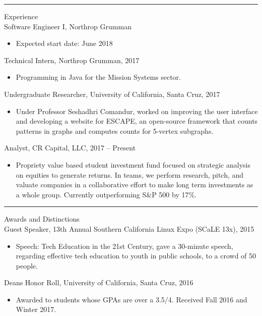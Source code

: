 \documentclass{res}
\begin{document}
\begin{resume}
\hrule width18.5cm

{\huge Experience}\\[2mm]
{\Large Software Engineer I, Northrop Grumman}\\
	\begin{itemize}
		\vspace{-3mm}
		\item Expected start date: June 2018
	\end{itemize}
{\Large Technical Intern, Northrop Grumman, 2017}\\
	\begin{itemize}
		\vspace{-3mm}
		\item Programming in Java for the Mission Systems sector.
	\end{itemize}
{\Large Undergraduate Researcher, University of California, Santa Cruz, 2017}\\
	\begin{itemize}
		\vspace{-3mm}
		\item Under Professor Seshadhri Comandur, worked on improving the user interface and developing a website for ESCAPE, an open-source framework that counts patterns in graphs and computes counts for 5-vertex subgraphs.
	\end{itemize}
{\Large Analyst, CR Capital, LLC, 2017 -- Present}\\
	\begin{itemize}
		\vspace{-3mm}
		\item Propriety value based student investment fund focused on strategic analysis on equities to generate returns. In teams, we perform research, pitch, and valuate companies in a collaborative effort to make long term investments as a whole group. Currently outperforming S\&P 500 by 17\%.
	\end{itemize}
	\vspace{2mm}

\hrule width18.5cm

{\huge Awards and Distinctions}\\[2mm]
{\Large Guest Speaker, 13th Annual Southern California Linux Expo (SCaLE 13x), 2015}\\
	\begin{itemize}
		\vspace{-3mm}
		\item Speech: Tech Education in the 21st Century, gave a 30-minute speech, regarding effective tech education to youth in public schools, to a crowd of 50 people.
	\end{itemize}
{\Large Dean\textquotesingle s Honor Roll, University of California, Santa Cruz, 2016}\\
	\begin{itemize}
		\vspace{-3mm}
		\item Awarded to students whose GPAs are over a 3.5/4. Received Fall 2016 and Winter 2017.
	\end{itemize}
\vspace{-1mm}

\end{resume}
\end{document}
